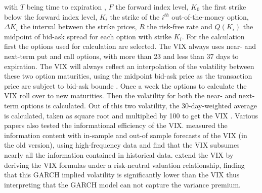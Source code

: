 with $T$ being time to expiration , $F$ the forward index level, $K_{0}$ the first strike below the forward index level, $K_{i}$ the strike of the $i^{th}$ out-of-the-money option, $\Delta K_{i}$ the interval between the strike prices, $R$ the risk-free rate and $Q(K_{i})$ the midpoint of bid-ask spread for each option with strike $K_{i}$. For the calculation first the options used for calculation are selected. The VIX always uses near- and next-term put and call options, with more than 23 and less than 37 days to expiration. The VIX will always reflect an interpolation of the volatility between these two option maturities, using the midpoint bid-ask price as the transaction price are subject to bid-ask bounde \parencite{poon2003}. Once a week the options to calculate the VIX roll over to new maturities. Then the volatility for both the near- and next-term options is calculated. Out of this two volatility, the 30-day-weighted average is calculated, taken as square root and multiplied by 100 to get the VIX \parencite{exchange2009}. Various papers also tested the informational efficiency of the VIX. \textcite{blair2000} measured the information content with in-sample and out-of sample forecasts of the VIX (in the old version), using high-frequency data and find that the VIX subsumes nearly all the information contained in historical data. \textcite{hao2013} extend the VIX by deriving the VIX formulas under a risk-neutral valuation relationship, finding that this GARCH implied volatility is significantly lower than the VIX thus interpreting that the GARCH model can not capture the variance premium. 



